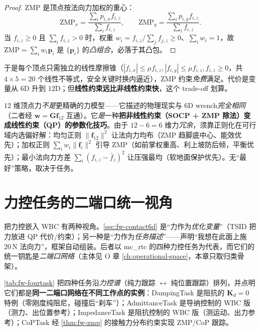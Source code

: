 \begin{proof}
ZMP 是顶点按法向力加权的重心：
\begin{equation}
  \mathrm{ZMP}_x=\frac{\sum_i p_{i,x}f_{i,z}}{\sum_i f_{i,z}},\qquad
  \mathrm{ZMP}_y=\frac{\sum_i p_{i,y}f_{i,z}}{\sum_i f_{i,z}}.
  \label{eq:fw-zmp-cvx}
\end{equation}
当 $f_{i,z}\ge0$ 且 $\sum_i f_{i,z}>0$ 时，权重 $w_i=f_{i,z}/\sum_j f_{j,z}\ge0$、$\sum_i w_i=1$，故 $\mathrm{ZMP}=\sum_i w_i\mathbf{p}_i$ 是 $\{\mathbf{p}_i\}$ 的\emph{凸组合}，必落于其凸包。
\end{proof}

于是每个顶点只需独立的线性摩擦锥（$|f_{i,x}|\le\mu f_{i,z},|f_{i,y}|\le\mu f_{i,z},f_{i,z}\ge0$，共 $4\times5=20$ 个线性不等式，安全关键时换内逼近），ZMP 约束\emph{免费}满足。代价是变量从 $6$D 升到 $12$D；但\textbf{线性约束远比非线性约束快}，这个 trade-off 划算。

\begin{insight}
\label{ins:fw-12d}
$12$ 维顶点力\emph{不是}更精确的力模型——它描述的物理现实与 $6$D wrench\emph{完全相同}（二者经 $\mathbf{w}=\mathbf{G}\mathbf{f}_{12}$ 互通）。它\emph{是}一种\textbf{把非线性约束（SOCP + ZMP 除法）变成线性约束（QP）的参数化技巧}。由于 $12-6=6$ 维力\emph{冗余}，须靠正则化在可行域内选偏好解：均匀正则 $\|\mathbf{f}_{12}\|^2$ 让法向力均布（ZMP 趋脚底中心、能效优先）；加权正则 $\sum_i w_i\|\mathbf{f}_i\|^2$ 引导 ZMP（如前掌权重高、利上坡防后倾，平衡优先）；最小法向力方差 $\sum_i(f_{i,z}-\bar f_z)^2$ 让压强最均（软地面保护优先）。无“最好”策略，取决于任务。
\end{insight}

\section{力控任务的二端口统一视角}
\label{sec:fw-twoport}

把力控嵌入 WBC 有两种视角。\cref{sec:fw-contact6d} 是“力作为\emph{优化变量}”（TSID 把力放进 QP 代价/约束）；另一种是“力作为\emph{任务描述}”——声明“我想在此面上施 $20\,\mathrm{N}$ 法向力”，框架自动组装。后者以 mc\_rtc 的四种力控任务为代表，而它们的统一钥匙是\emph{二端口网络}（主体见 O 章 \cref{ch:operational-space}，本章只取归类骨架）。

\cref{tab:fw-fourtask} 把四种任务沿\emph{力控谱}（纯力跟踪 $\leftrightarrow$ 纯位置跟踪）排列，并点明它们都是\textbf{同一二端口网络在不同工作点的实例}：DampingTask 是阻抗的 $\mathbf{K}_d=0$ 特例（零刚度纯阻尼，碰撞后“刹车”）；AdmittanceTask 是导纳控制的 WBC 版（测力、出位置参考）；ImpedanceTask 是阻抗控制的 WBC 版（测运动、出力参考）；CoPTask 经 \cref{thm:fw-zmp} 的接触力分布约束实现 ZMP/CoP 跟踪。

